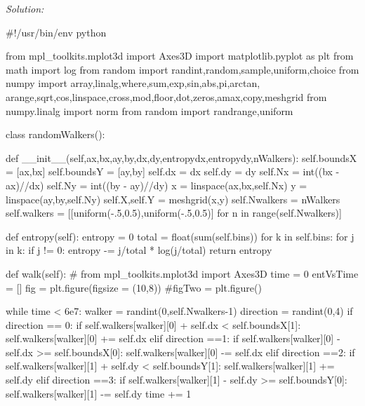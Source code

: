 \ifsolutions
\textit{Solution:}\\
\begin{codeexample}
\begin{VerbatimOut}{\listingFile}
#!/usr/bin/env python

from mpl_toolkits.mplot3d import Axes3D
import matplotlib.pyplot as plt
from math import log
from random import randint,random,sample,uniform,choice
from numpy import array,linalg,where,sum,exp,sin,abs,pi,arctan, arange,sqrt,cos,linspace,cross,mod,floor,dot,zeros,amax,copy,meshgrid
from numpy.linalg import norm
from random import randrange,uniform



class randomWalkers():

    def __init__(self,ax,bx,ay,by,dx,dy,entropydx,entropydy,nWalkers):
        self.boundsX = [ax,bx]
        self.boundsY = [ay,by]
        self.dx = dx
        self.dy = dy
        self.Nx = int((bx - ax)//dx)
        self.Ny = int((by - ay)//dy)
        x = linspace(ax,bx,self.Nx)
        y = linspace(ay,by,self.Ny)
        self.X,self.Y = meshgrid(x,y)
        self.Nwalkers = nWalkers
        self.walkers = [[uniform(-.5,0.5),uniform(-.5,0.5)] for n in range(self.Nwalkers)]

    def entropy(self):
        entropy = 0
        total = float(sum(self.bins))
        for k in self.bins:
            for j in k:
                if j != 0:
                    entropy -= j/total * log(j/total)
        return entropy


    def walk(self):
        #        from mpl_toolkits.mplot3d import Axes3D
        time = 0
        entVsTime = []
        fig = plt.figure(figsize = (10,8))
        #figTwo = plt.figure()
                    
        while time < 6e7:
            walker = randint(0,self.Nwalkers-1)
            direction = randint(0,4)
            if direction == 0:
                if self.walkers[walker][0] + self.dx < self.boundsX[1]:
                    self.walkers[walker][0] += self.dx
            elif direction ==1:
                if self.walkers[walker][0] - self.dx >= self.boundsX[0]:
                    self.walkers[walker][0] -= self.dx
            elif direction ==2:
                if self.walkers[walker][1] + self.dy < self.boundsY[1]:
                    self.walkers[walker][1] += self.dy
            elif direction ==3:
                if self.walkers[walker][1] - self.dy >= self.boundsY[0]:
                    self.walkers[walker][1] -= self.dy
            time += 1


\end{VerbatimOut}
\end{codeexample}
